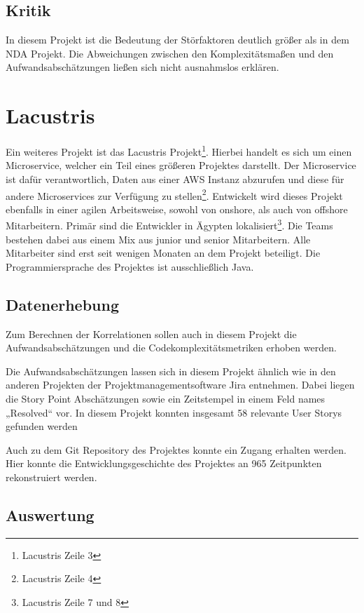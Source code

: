 \subsection{Kritik}\label{Alstonii-kritik}

In diesem Projekt ist die Bedeutung der Störfaktoren deutlich größer als
in dem NDA Projekt. Die Abweichungen zwischen den Komplexitätsmaßen und
den Aufwandsabschätzungen ließen sich nicht ausnahmslos erklären.

\section{Lacustris}\label{lacustris}

Ein weiteres Projekt ist das Lacustris Projekt\footnote{Lacustris
  Zeile 3}. Hierbei handelt es sich um einen Microservice, welcher ein
Teil eines größeren Projektes darstellt. Der Microservice ist dafür
verantwortlich, Daten aus einer \ac{AWS} Instanz abzurufen und diese für
andere Microservices zur Verfügung zu stellen\footnote{Lacustris Zeile 4}.
Entwickelt wird dieses Projekt ebenfalls in einer agilen Arbeitsweise,
sowohl von onshore, als auch von offshore Mitarbeitern. Primär sind die
Entwickler in Ägypten lokalisiert\footnote{Lacustris Zeile 7 und 8}. Die
Teams bestehen dabei aus einem Mix aus junior und senior Mitarbeitern.
Alle Mitarbeiter sind erst seit wenigen Monaten an dem Projekt
beteiligt. Die Programmiersprache des Projektes ist ausschließlich Java.

\subsection{Datenerhebung}\label{lm-Datenerhebung}

Zum Berechnen der Korrelationen sollen auch in diesem Projekt die
Aufwandsabschätzungen und die Codekomplexitätsmetriken erhoben werden.

Die Aufwandsabschätzungen lassen sich in diesem Projekt ähnlich wie in
den anderen Projekten der Projektmanagementsoftware Jira entnehmen.
Dabei liegen die Story Point Abschätzungen sowie ein Zeitstempel in
einem Feld names „Resolved`` vor. In diesem Projekt konnten insgesamt 58
relevante User Storys gefunden werden

Auch zu dem Git Repository des Projektes konnte ein Zugang erhalten
werden. Hier konnte die Entwicklungsgeschichte des Projektes an 965
Zeitpunkten rekonstruiert werden.

\subsection{Auswertung}\label{lm-Auswertung}

